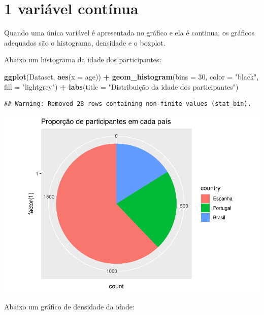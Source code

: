 \documentclass[
]{book}
\newenvironment{Shaded}{\begin{snugshade}}{\end{snugshade}}
\newcommand{\DataTypeTok}[1]{\textcolor[rgb]{0.13,0.29,0.53}{#1}}
\newcommand{\DecValTok}[1]{\textcolor[rgb]{0.00,0.00,0.81}{#1}}
\newcommand{\KeywordTok}[1]{\textcolor[rgb]{0.13,0.29,0.53}{\textbf{#1}}}
\newcommand{\NormalTok}[1]{#1}
\newcommand{\OperatorTok}[1]{\textcolor[rgb]{0.81,0.36,0.00}{\textbf{#1}}}
\newcommand{\StringTok}[1]{\textcolor[rgb]{0.31,0.60,0.02}{#1}}
\begin{document}
\hypertarget{variuxe1vel-contuxednua}{%
\section{1 variável contínua}\label{variuxe1vel-contuxednua}}

Quando uma única variável é apresentada no gráfico e ela é continua, os gráficos adequados são o histograma, densidade e o boxplot.

Abaixo um histograma da idade dos participantes:

\begin{Shaded}
\begin{Highlighting}[]
\KeywordTok{ggplot}\NormalTok{(Dataset, }\KeywordTok{aes}\NormalTok{(}\DataTypeTok{x =}\NormalTok{ age)) }\OperatorTok{+}
\StringTok{  }\KeywordTok{geom_histogram}\NormalTok{(}\DataTypeTok{bins =} \DecValTok{30}\NormalTok{, }\DataTypeTok{color =} \StringTok{"black"}\NormalTok{, }\DataTypeTok{fill =} \StringTok{"lightgrey"}\NormalTok{) }\OperatorTok{+}
\StringTok{  }\KeywordTok{labs}\NormalTok{(}\DataTypeTok{title =} \StringTok{"Distribuição da idade dos participantes"}\NormalTok{)}
\end{Highlighting}
\end{Shaded}

\begin{verbatim}
## Warning: Removed 28 rows containing non-finite values (stat_bin).
\end{verbatim}

\includegraphics{gitbook-demo_files/figure-latex/unnamed-chunk-15-1.pdf}

Abaixo um gráfico de densidade da idade:
\end{document}
